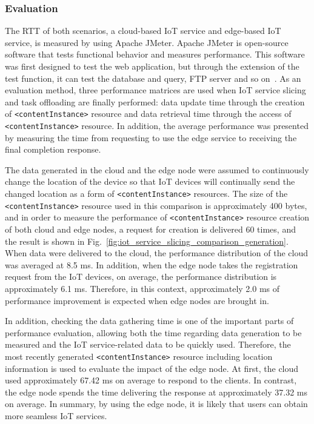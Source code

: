 \subsubsection{Evaluation}
The RTT of both scenarios, a cloud-based IoT service and  edge-based IoT service, is measured by using Apache JMeter. 
Apache JMeter is open-source software that tests functional behavior and measures performance. 
This software was first designed to test the web application, but through the extension of the test function, it can test the database and query, FTP server and so on~\cite{jing2010jmeter}. 
As an evaluation method, three performance matrices are used when IoT service slicing and task offloading are finally performed: data update time through the creation of \texttt{<contentInstance>} resource and data retrieval time through the access of \texttt{<contentInstance>} resource. 
In addition, the average performance was presented by measuring the time from requesting to use the edge service to receiving the final completion response.

The data generated in the cloud and the edge node were assumed to continuously change the location of the device so that IoT devices will continually send the changed location as a form of \texttt{<contentInstance>} resources. The size of the \texttt{<contentInstance>} resource used in this comparison is approximately 400 bytes, and in order to measure the performance of \texttt{<contentInstance>} resource creation of both cloud and edge nodes, a request for creation is delivered 60 times, and the result is shown in Fig.~\ref{fig:iot_service_slicing_comparison_generation}. 
When data were delivered to the cloud, the performance distribution of the cloud was averaged at 8.5 ms. 
In addition, when the edge node takes the registration request from the IoT devices, on average, the performance distribution is approximately 6.1 ms. Therefore, in this context, approximately 2.0 ms of performance improvement is expected when edge nodes are brought in.

In addition, checking the data gathering time is one of the important parts of performance evaluation, allowing both the time regarding data generation to be measured and the IoT service-related data to be quickly used. 
Therefore, the most recently generated \texttt{<contentInstance>} resource including location information is used to evaluate the impact of the edge node. At first, the cloud used approximately 67.42 ms on average to respond to the clients. 
In contrast, the edge node spends the time delivering the response at approximately 37.32 ms on average. In summary, by using the edge node, it is likely that users can obtain more seamless IoT services.

